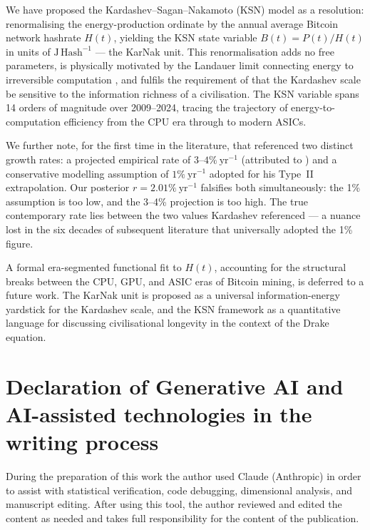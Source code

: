 We have proposed the Kardashev--Sagan--Nakamoto (KSN) model as a resolution: renormalising
the energy-production ordinate by the annual average Bitcoin network hashrate $H(t)$,
yielding the KSN state variable $B(t)=P(t)/H(t)$ in units of $\mathrm{J\,Hash^{-1}}$ ---
the KarNak unit. This renormalisation adds no free parameters, is physically motivated by
the Landauer limit connecting energy to irreversible computation \citep{Landauer1961}, and
fulfils the requirement of \citet{Sagan1973} that the Kardashev scale be sensitive to the
information richness of a civilisation. The KSN variable spans 14 orders of magnitude over
2009--2024, tracing the trajectory of energy-to-computation efficiency from the CPU era
through to modern ASICs.

We further note, for the first time in the literature, that \citet{Kardashev1964}
referenced two distinct growth rates: a projected empirical rate of
$3$--$4\%~\mathrm{yr^{-1}}$ (attributed to \citealp{Putnam1948}) and a conservative
modelling assumption of $1\%~\mathrm{yr^{-1}}$ adopted for his Type~II extrapolation. Our
posterior $r=2.01\%~\mathrm{yr^{-1}}$ falsifies both simultaneously: the 1\% assumption is
too low, and the 3--4\% projection is too high. The true contemporary rate lies between the
two values Kardashev referenced --- a nuance lost in the six decades of subsequent
literature that universally adopted the 1\% figure.

A formal era-segmented functional fit to $H(t)$, accounting for the structural breaks
between the CPU, GPU, and ASIC eras of Bitcoin mining, is deferred to a future work. The
KarNak unit is proposed as a universal information-energy yardstick for the Kardashev
scale, and the KSN framework as a quantitative language for discussing civilisational
longevity in the context of the Drake equation.

\section*{Declaration of Generative AI and AI-assisted technologies in the writing process}

During the preparation of this work the author used Claude (Anthropic) in order to assist
with statistical verification, code debugging, dimensional analysis, and manuscript
editing. After using this tool, the author reviewed and edited the content as needed and
takes full responsibility for the content of the publication.

